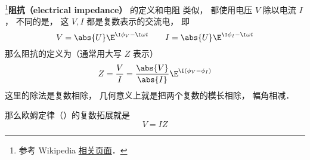 
\begin{issues}
\issueDraft
\end{issues}


\footnote{参考 Wikipedia \href{https://en.wikipedia.org/wiki/Electrical_impedance}{相关页面}．}\textbf{阻抗（electrical impedance）} 的定义和电阻 类似， 都使用电压 $V$ 除以电流 $I$， 不同的是， 这 $V, I$ 都是复数表示的交流电， 即
\begin{equation}
V = \abs{U} \E^{\I \phi_V - \I \omega t}
\qquad
I = \abs{U} \E^{\I \phi_I - \I \omega t}
\end{equation}
那么阻抗的定义为（通常用大写 $Z$ 表示）
\begin{equation}
Z = \frac{V}{I} = \frac{\abs{V}}{\abs{I}} \E^{\I (\phi_V - \phi_I)}
\end{equation}
这里的除法是复数相除， 几何意义上就是把两个复数的模长相除， 幅角相减．

那么欧姆定律（）的复数拓展就是
\begin{equation}
V = IZ
\end{equation}

